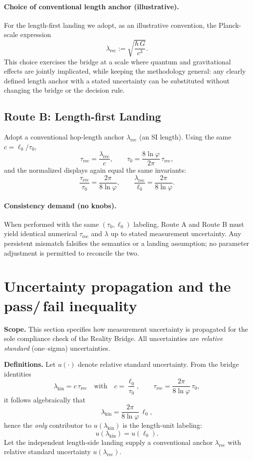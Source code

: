 \documentclass[11pt]{article}
\theoremstyle{plain}
\theoremstyle{definition}
\theoremstyle{remark}
\begin{document}
\paragraph{Choice of conventional length anchor (illustrative).}
For the length-first landing we adopt, as an illustrative convention, the Planck-scale expression~\cite{CGPM2018}
\[
\lambda_{\mathrm{rec}}:=\sqrt{\frac{\hbar\,G}{c^{3}}}.
\]
This choice exercises the bridge at a scale where quantum and gravitational effects are jointly implicated, while keeping the methodology general: any clearly defined length anchor with a stated uncertainty can be substituted without changing the bridge or the decision rule.

\subsection*{Route B: Length-first Landing}
Adopt a conventional hop-length anchor \(\lambda_{\mathrm{rec}}\) (an SI length). Using the same \(c=\ell_{0}/\tau_{0}\),
\[
\tau_{\mathrm{rec}}=\frac{\lambda_{\mathrm{rec}}}{c},
\qquad
\tau_{0}=\frac{8\ln\varphi}{2\pi}\,\tau_{\mathrm{rec}},
\]
and the normalized displays again equal the same invariants:
\[
\frac{\tau_{\mathrm{rec}}}{\tau_{0}}=\frac{2\pi}{8\ln\varphi},
\qquad
\frac{\lambda_{\mathrm{rec}}}{\ell_{0}}=\frac{2\pi}{8\ln\varphi}.
\]

\paragraph{Consistency demand (no knobs).}
When performed with the same \((\tau_{0},\ell_{0})\) labeling, Route A and Route B must yield identical numerical \(\tau_{\mathrm{rec}}\) and \(\lambda\) up to stated measurement uncertainty. Any persistent mismatch falsifies the semantics or a landing assumption; no parameter adjustment is permitted to reconcile the two.

\section{Uncertainty propagation and the pass/\,fail inequality}

\noindent\textbf{Scope.} This section specifies how measurement uncertainty is propagated for the sole compliance check of the Reality Bridge. All uncertainties are \emph{relative standard} (one–sigma) uncertainties.

\medskip
\noindent\textbf{Definitions.} Let \(u(\cdot)\) denote relative standard uncertainty. From the bridge identities
\[
\lambda_{\mathrm{kin}}=c\,\tau_{\mathrm{rec}}
\quad\text{with}\quad
c=\frac{\ell_{0}}{\tau_{0}},
\qquad
\tau_{\mathrm{rec}}=\frac{2\pi}{8\ln\varphi}\,\tau_{0},
\]
it follows algebraically that
\[
\lambda_{\mathrm{kin}}
=\frac{2\pi}{8\ln\varphi}\,\ell_{0},
\]
hence the \emph{only} contributor to \(u(\lambda_{\mathrm{kin}})\) is the length-unit labeling:
\[
u(\lambda_{\mathrm{kin}})=u(\ell_{0}).
\]
Let the independent length-side landing supply a conventional anchor \(\lambda_{\mathrm{rec}}\) with relative standard uncertainty \(u(\lambda_{\mathrm{rec}})\).
\end{document}
